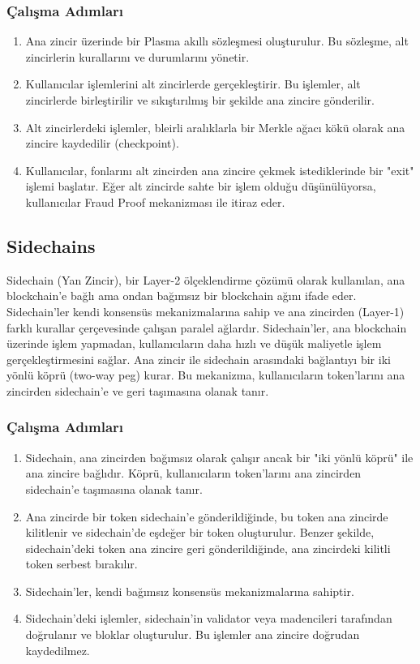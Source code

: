 \subsubsection{Çalışma Adımları}

\begin{enumerate}
    \item Ana zincir üzerinde bir Plasma akıllı sözleşmesi oluşturulur. Bu sözleşme, alt zincirlerin kurallarını ve durumlarını yönetir.
    \item Kullanıcılar işlemlerini alt zincirlerde gerçekleştirir. Bu işlemler, alt zincirlerde birleştirilir ve sıkıştırılmış bir şekilde ana zincire gönderilir.
    \item Alt zincirlerdeki işlemler, bleirli aralıklarla bir Merkle ağacı kökü olarak ana zincire kaydedilir (checkpoint).
    \item Kullanıcılar, fonlarını alt zincirden ana zincire çekmek istediklerinde bir "exit" işlemi başlatır. Eğer alt zincirde sahte bir işlem olduğu düşünülüyorsa, kullanıcılar Fraud Proof mekanizması ile itiraz eder.
\end{enumerate}

\subsection{Sidechains}

Sidechain (Yan Zincir), bir Layer-2 ölçeklendirme çözümü olarak kullanılan, ana blockchain'e bağlı ama ondan bağımsız bir blockchain ağını ifade eder. Sidechain'ler kendi konsensüs mekanizmalarına sahip ve ana zincirden (Layer-1) farklı kurallar çerçevesinde çalışan paralel ağlardır. Sidechain'ler, ana blockchain üzerinde işlem yapmadan, kullanıcıların daha hızlı ve düşük maliyetle işlem gerçekleştirmesini sağlar. Ana zincir ile sidechain arasındaki bağlantıyı bir iki yönlü köprü (two-way peg) kurar. Bu mekanizma, kullanıcıların token'larını ana zincirden sidechain'e ve geri taşımasına olanak tanır.

\subsubsection{Çalışma Adımları}

\begin{enumerate}
    \item Sidechain, ana zincirden bağımsız olarak çalışır ancak bir "iki yönlü köprü" ile ana zincire bağlıdır. Köprü, kullanıcıların token'larını ana zincirden sidechain'e taşımasına olanak tanır.
    \item Ana zincirde bir token sidechain'e gönderildiğinde, bu token ana zincirde kilitlenir ve sidechain'de eşdeğer bir token oluşturulur. Benzer şekilde, sidechain'deki token ana zincire geri gönderildiğinde, ana zincirdeki kilitli token serbest bırakılır.
    \item Sidechain'ler, kendi bağımsız konsensüs mekanizmalarına sahiptir.
    \item Sidechain'deki işlemler, sidechain'in validator veya madencileri tarafından doğrulanır ve bloklar oluşturulur. Bu işlemler ana zincire doğrudan kaydedilmez.
\end{enumerate}

\newpage